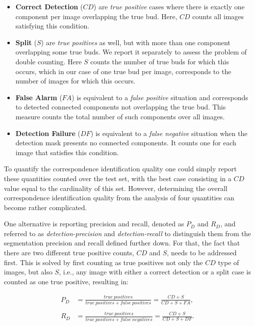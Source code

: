 \documentclass[a4paper,authoryear,review]{elsarticle}
\begin{document}
	\begin{itemize}
		\item \textbf{Correct Detection} ($CD$) are \emph{true positive} cases where there is exactly one component per image overlapping the true bud. Here, $CD$ counts all images satisfying this condition.
		
		\item \textbf{Split} ($S$) are \emph{true positives} as well, but with more than one component overlapping some true buds. We report it separately to assess the problem of double counting. Here $S$ counts the number of true buds for which this occurs, which in our case of one true bud per image, corresponds to the number of images for which this occurs. 
		
		\item \textbf{False Alarm} ($FA$) is equivalent to a \emph{false positive} situation and corresponds to detected connected components not overlapping the true bud. This measure counts the total number of such components over all images.
		
		\item \textbf{Detection Failure} ($DF$) is equivalent to a \emph{false negative} situation when the detection mask presents no connected components. It counts one for each image that satisfies this condition.
	\end{itemize}
	
	To quantify the correspondence identification quality one could simply report these quantities counted over the test set, with the best case consisting in a $CD$ value equal to the cardinality of this set. However, determining the overall correspondence identification quality from the analysis of four quantities can become rather complicated. 
	
	One alternative is reporting precision and recall, denoted as $P_D$ and $R_D$, and referred to as \emph{detection-precision} and \emph{detection-recall} to distinguish them from the segmentation precision and recall defined further down. For that, the fact that there are two different true positive counts, $CD$ and $S$, needs to be addressed first. This is solved by first counting as true positives not only the $CD$ type of images, but also $S$, i.e., any image with either a correct detection or a split case is counted as one true positive, resulting in:
	
	\begin{align*}
	P_D &= \frac{true\ positives}{true\ positives+false\ positives}
	= \frac{CD+S}{CD+S+FA},\\
	\\
	R_D &= \frac{true\ positives}{true\ positives+false\ negatives}
	= \frac{CD+S}{CD+S+DF}.    \\    
	\end{align*}
	
\end{document}
